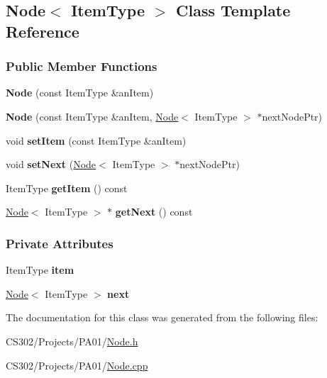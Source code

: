 \hypertarget{class_node}{}\subsection{Node$<$ Item\+Type $>$ Class Template Reference}
\label{class_node}
\subsubsection*{Public Member Functions}
\begin{DoxyCompactItemize}
\item 
{\bfseries Node} (const Item\+Type \&an\+Item)\hypertarget{class_node_a0288598fcb0244739ce95099c26250ae}{}\label{class_node_a0288598fcb0244739ce95099c26250ae}

\item 
{\bfseries Node} (const Item\+Type \&an\+Item, \hyperlink{class_node}{Node}$<$ Item\+Type $>$ $\ast$next\+Node\+Ptr)\hypertarget{class_node_adf98d3f9b7227622cb5a0fdd7e8f0b18}{}\label{class_node_adf98d3f9b7227622cb5a0fdd7e8f0b18}

\item 
void {\bfseries set\+Item} (const Item\+Type \&an\+Item)\hypertarget{class_node_ab4ceecdecc5df799011de486b9f54974}{}\label{class_node_ab4ceecdecc5df799011de486b9f54974}

\item 
void {\bfseries set\+Next} (\hyperlink{class_node}{Node}$<$ Item\+Type $>$ $\ast$next\+Node\+Ptr)\hypertarget{class_node_a01c1a66d4e39f5b149e090413deb4633}{}\label{class_node_a01c1a66d4e39f5b149e090413deb4633}

\item 
Item\+Type {\bfseries get\+Item} () const \hypertarget{class_node_a4e5519463291a0c1570014f4ee5ca130}{}\label{class_node_a4e5519463291a0c1570014f4ee5ca130}

\item 
\hyperlink{class_node}{Node}$<$ Item\+Type $>$ $\ast$ {\bfseries get\+Next} () const \hypertarget{class_node_a44fbda8e8d17a37e8203434c2909ea07}{}\label{class_node_a44fbda8e8d17a37e8203434c2909ea07}

\end{DoxyCompactItemize}
\subsubsection*{Private Attributes}
\begin{DoxyCompactItemize}
\item 
Item\+Type {\bfseries item}\hypertarget{class_node_a73e84414314067aa019ba6afb06190bd}{}\label{class_node_a73e84414314067aa019ba6afb06190bd}

\item 
\hyperlink{class_node}{Node}$<$ Item\+Type $>$ {\bfseries next}\hypertarget{class_node_a0e62e644b5352ff676ba06a2271ab8ce}{}\label{class_node_a0e62e644b5352ff676ba06a2271ab8ce}

\end{DoxyCompactItemize}


The documentation for this class was generated from the following files\+:\begin{DoxyCompactItemize}
\item 
C\+S302/\+Projects/\+P\+A01/\hyperlink{_node_8h}{Node.\+h}\item 
C\+S302/\+Projects/\+P\+A01/\hyperlink{_node_8cpp}{Node.\+cpp}\end{DoxyCompactItemize}
